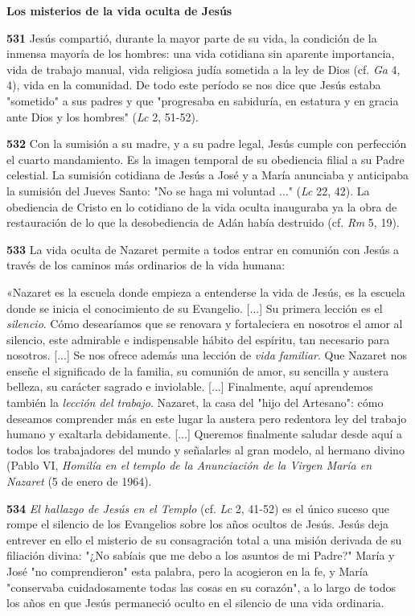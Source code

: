 \documentclass[]{article}
\begin{document}
\textbf{Los misterios de la vida oculta de Jesús}

\textbf{531} Jesús compartió, durante la mayor parte de su vida, la
condición de la inmensa mayoría de los hombres: una vida cotidiana sin
aparente importancia, vida de trabajo manual, vida religiosa judía
sometida a la ley de Dios (cf. \emph{Ga} 4, 4), vida en la comunidad. De
todo este período se nos dice que Jesús estaba "sometido" a sus padres y
que "progresaba en sabiduría, en estatura y en gracia ante Dios y los
hombres" (\emph{Lc} 2, 51-52).

\textbf{532} Con la sumisión a su madre, y a su padre legal, Jesús
cumple con perfección el cuarto mandamiento. Es la imagen temporal de su
obediencia filial a su Padre celestial. La sumisión cotidiana de Jesús a
José y a María anunciaba y anticipaba la sumisión del Jueves Santo: "No
se haga mi voluntad ..." (\emph{Lc} 22, 42). La obediencia de Cristo en
lo cotidiano de la vida oculta inauguraba ya la obra de restauración de
lo que la desobediencia de Adán había destruido (cf. \emph{Rm} 5, 19).

\textbf{533} La vida oculta de Nazaret permite a todos entrar en
comunión con Jesús a través de los caminos más ordinarios de la vida
humana:

«Nazaret es la escuela donde empieza a entenderse la vida de Jesús, es
la escuela donde se inicia el conocimiento de su Evangelio. {[}...{]} Su
primera lección es el \emph{silencio}. Cómo desearíamos que se renovara
y fortaleciera en nosotros el amor al silencio, este admirable e
indispensable hábito del espíritu, tan necesario para nosotros.
{[}...{]} Se nos ofrece además una lección de \emph{vida familiar}. Que
Nazaret nos enseñe el significado de la familia, su comunión de amor, su
sencilla y austera belleza, su carácter sagrado e inviolable. {[}...{]}
Finalmente, aquí aprendemos también la \emph{lección del trabajo}.
Nazaret, la casa del "hijo del Artesano": cómo deseamos comprender más
en este lugar la austera pero redentora ley del trabajo humano y
exaltarla debidamente. {[}...{]} Queremos finalmente saludar desde aquí
a todos los trabajadores del mundo y señalarles al gran modelo, al
hermano divino (Pablo VI, \emph{Homilía en el templo de la Anunciación
de la Virgen María en Nazaret} (5 de enero de 1964).

\textbf{534} \emph{El hallazgo de Jesús en el Templo} (cf. \emph{Lc} 2,
41-52) es el único suceso que rompe el silencio de los Evangelios sobre
los años ocultos de Jesús. Jesús deja entrever en ello el misterio de su
consagración total a una misión derivada de su filiación divina: "¿No
sabíais que me debo a los asuntos de mi Padre?" María y José "no
comprendieron" esta palabra, pero la acogieron en la fe, y María
"conservaba cuidadosamente todas las cosas en su corazón", a lo largo de
todos los años en que Jesús permaneció oculto en el silencio de una vida
ordinaria.
\end{document}
